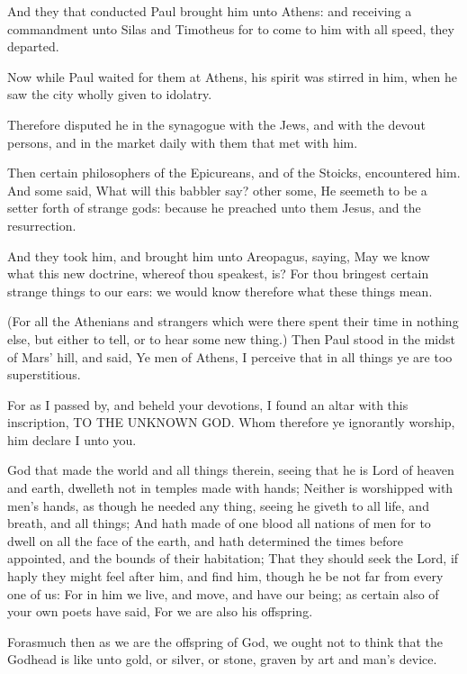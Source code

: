 \Verse And they that conducted Paul brought him unto Athens: and receiving a commandment unto Silas and Timotheus for to come to him with all speed, they departed.

\Verse Now while Paul waited for them at Athens, his spirit was stirred in him, when he saw the city wholly given to idolatry.

\Verse Therefore disputed he in the synagogue with the Jews, and with the devout persons, and in the market daily with them that met with him.

\Verse Then certain philosophers of the Epicureans, and of the Stoicks, encountered him. And some said, What will this babbler say? other some, He seemeth to be a setter forth of strange gods: because he preached unto them Jesus, and the resurrection.

\Verse And they took him, and brought him unto Areopagus, saying, May we know what this new doctrine, whereof thou speakest, is?  \Verse For thou bringest certain strange things to our ears: we would know therefore what these things mean.

\Verse (For all the Athenians and strangers which were there spent their time in nothing else, but either to tell, or to hear some new thing.)  \Verse Then Paul stood in the midst of Mars' hill, and said, Ye men of Athens, I perceive that in all things ye are too superstitious.

\Verse For as I passed by, and beheld your devotions, I found an altar with this inscription, TO THE UNKNOWN GOD. Whom therefore ye ignorantly worship, him declare I unto you.

\Verse God that made the world and all things therein, seeing that he is Lord of heaven and earth, dwelleth not in temples made with hands; \Verse Neither is worshipped with men's hands, as though he needed any thing, seeing he giveth to all life, and breath, and all things; \Verse And hath made of one blood all nations of men for to dwell on all the face of the earth, and hath determined the times before appointed, and the bounds of their habitation; \Verse That they should seek the Lord, if haply they might feel after him, and find him, though he be not far from every one of us: \Verse For in him we live, and move, and have our being; as certain also of your own poets have said, For we are also his offspring.

\Verse Forasmuch then as we are the offspring of God, we ought not to think that the Godhead is like unto gold, or silver, or stone, graven by art and man's device.

